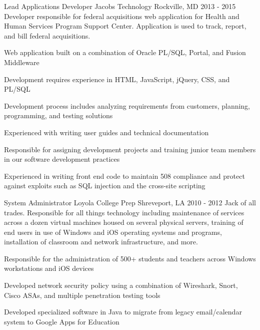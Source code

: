\begin{cventries}
  \cventrysix
    {Lead Applications Developer} %
    {Jacobs Technology} %
    {Rockville, MD} %
    {2013 - 2015} %
    {Developer responsible for federal acquisitions web application for Health and Human Services Program Support Center. Application is used to track, report, and bill federal acquisitions.} %
    {
      \begin{cvitems} %
        \item {Web application built on a combination of Oracle PL/SQL, Portal, and Fusion Middleware}
        \item {Development requires experience in HTML, JavaScript, jQuery, CSS, and PL/SQL}
        \item {Development process includes analyzing requirements from customers, planning, programming, and testing solutions}
        \item {Experienced with writing user guides and technical documentation}
        \item {Responsible for assigning development projects and training junior team members in our software development practices}
        \item {Experienced in writing front end code to maintain 508 compliance and protect against exploits such as SQL injection and the cross-site scripting}
      \end{cvitems}
    }

  \cventrysix
    {System Administrator} %
    {Loyola College Prep} %
    {Shreveport, LA} %
    {2010 - 2012} %
    {Jack of all trades.  Responsible for all things technology including maintenance of services across a dozen virtual machines housed on several physical servers, training of end users in use of Windows and iOS operating systems and programs, installation of classroom and network infrastructure, and more.} %
    {
      \begin{cvitems} %
        \item {Responsible for the administration of 500+ students and teachers across Windows workstations and iOS devices}
        \item {Developed network security policy using a combination of Wireshark, Snort, Cisco ASAs, and multiple penetration testing tools}
        \item {Developed specialized software in Java to migrate from legacy email/calendar system to Google Apps for Education}
      \end{cvitems}
    }

\end{cventries}
